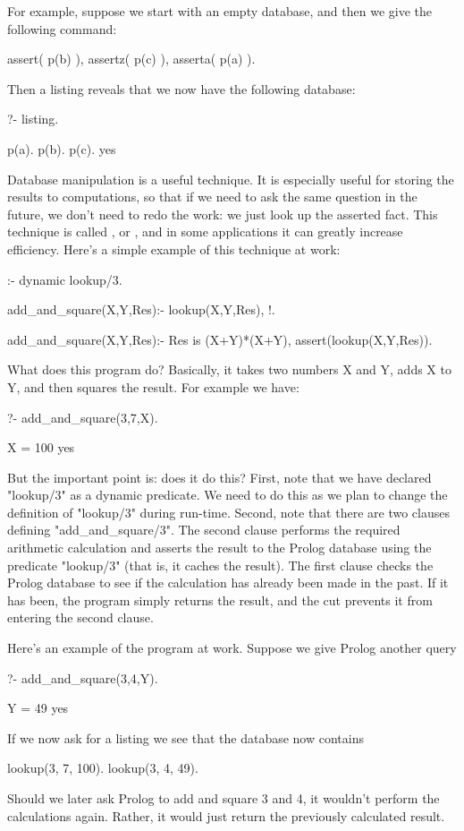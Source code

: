 For example, suppose we start with an empty database, and then
we give the following command:
\begin{LPNcodedisplay}
assert( p(b) ), assertz( p(c) ), asserta( p(a) ).
\end{LPNcodedisplay}
Then a listing reveals that we now have the following
database:
\begin{LPNcodedisplay}
?- listing.

p(a).
p(b).
p(c).
yes
\end{LPNcodedisplay}

Database manipulation is a useful technique.  It is especially useful
for storing the results to computations, so that if we need to ask the
same question in the future, we don't need to redo the work: we just look
up the asserted fact. This technique is called , or
, and in some applications it can greatly increase
efficiency. Here's a simple example of this  technique at work:

\begin{LPNcodedisplay}
:- dynamic lookup/3.

add_and_square(X,Y,Res):-
   lookup(X,Y,Res), !.

add_and_square(X,Y,Res):-
   Res is (X+Y)*(X+Y),
   assert(lookup(X,Y,Res)).
\end{LPNcodedisplay}

What does this program do?  Basically, it takes two numbers X and Y,
adds X to Y, and then squares the result. For example we have:

\begin{LPNcodedisplay}
?- add_and_square(3,7,X).

X = 100
yes
\end{LPNcodedisplay}

But the important point is:  does it do this?  First,
note that we have declared "lookup/3" as a dynamic predicate.  We need
to do this as we plan to change the definition of "lookup/3"
during run-time.  Second, note that there are two clauses defining
"add\_and\_square/3". The second clause performs the required arithmetic
calculation and asserts the result to the Prolog database using the
predicate "lookup/3" (that is, it  caches the result).  The first
clause checks the Prolog database to see if the calculation has
already been made in the past. If it has been, the program simply
returns the result, and the cut prevents it from entering the second
clause.

Here's an example of the program at work.
Suppose we give Prolog  another query
\begin{LPNcodedisplay}
?-  add_and_square(3,4,Y).

Y = 49
yes
\end{LPNcodedisplay}
If we now ask for a listing we see that the database now contains
\begin{LPNcodedisplay}
lookup(3, 7, 100).
lookup(3, 4, 49).
\end{LPNcodedisplay}
Should we later ask Prolog to add and square 3 and 4, it wouldn't
perform the calculations again. Rather, it would just return the
previously calculated result.

